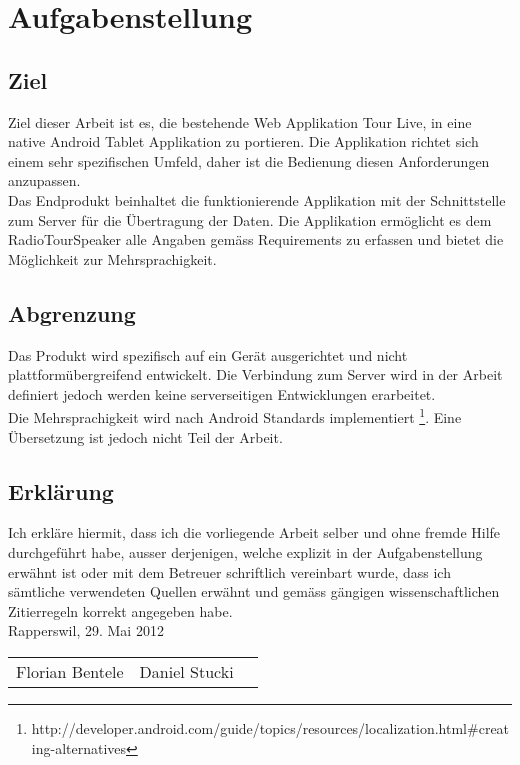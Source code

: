 \chapter*{Aufgabenstellung}

\section*{Ziel}
Ziel dieser Arbeit ist es, die bestehende Web Applikation Tour Live, in eine native Android Tablet Applikation zu portieren. Die Applikation richtet sich einem sehr spezifischen Umfeld, daher ist die Bedienung diesen Anforderungen anzupassen.
\\
Das Endprodukt beinhaltet die funktionierende Applikation mit der Schnittstelle zum Server für die Übertragung der Daten. Die Applikation ermöglicht es dem RadioTour\-Speaker alle Angaben gemäss Requirements zu erfassen und bietet die Möglichkeit zur Mehrsprachigkeit.

\section*{Abgrenzung}
Das Produkt wird spezifisch auf ein Gerät ausgerichtet und nicht plattformübergreifend entwickelt. Die Verbindung zum Server wird in der Arbeit definiert jedoch werden keine serverseitigen Entwicklungen erarbeitet.
\\
Die Mehrsprachigkeit wird nach Android Standards implementiert \footnote{http://developer.android.com/guide/topics/resources/localization.html\#creating-alternatives}. Eine Übersetzung ist jedoch nicht Teil der Arbeit.

\section*{Erklärung}
Ich erkläre hiermit, dass ich die vorliegende Arbeit selber und ohne fremde Hilfe durchgeführt habe, ausser derjenigen, welche explizit in der Aufgabenstellung erwähnt ist oder mit dem Betreuer schriftlich vereinbart wurde, dass ich sämtliche verwendeten Quellen erwähnt und gemäss gängigen wissenschaftlichen Zitierregeln korrekt angegeben habe.
\\[1em]
Rapperswil, 29. Mai 2012
\\[1em]
\begin{tabular}{p{10cm}ll}
Florian Bentele & Daniel Stucki

\end{tabular}
